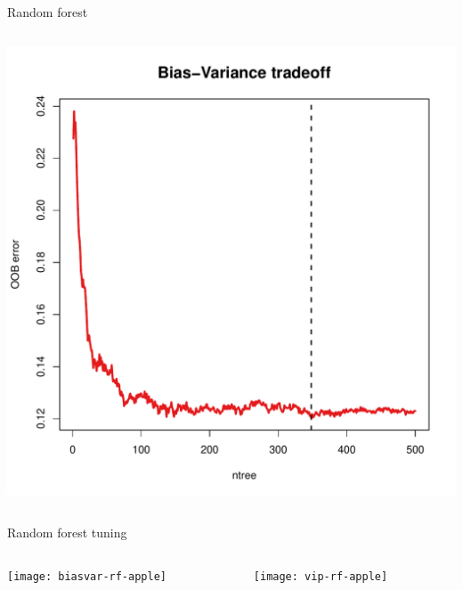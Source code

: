 \begin{frame}[fragile]{Random forest}
\begin{columns}[T]
\begin{column}{0.45\textwidth}
\hspace*{-0.8em}\includegraphics[width=1.1\columnwidth]{../r-StatsLearn-Exam/src/plots/biasvar-rf-apple}

\end{column}
\end{columns}

\end{frame}

\begin{frame}{Random forest tuning}

\begin{columns}[T]
\hspace*{-3em}\begin{column}{0.5\textwidth}
	\texttt{[image: biasvar-rf-apple]}
\end{column}
\hspace*{-2em}\begin{column}{0.5\textwidth}
	\texttt{[image: vip-rf-apple]}
\end{column}
\end{columns}

\end{frame}


